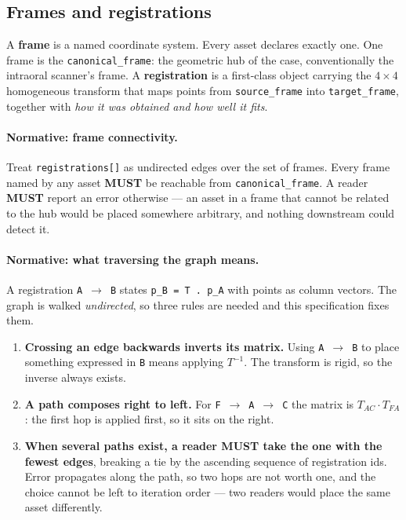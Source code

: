 \documentclass[11pt,a4paper]{article}
\newcommand{\MUST}{\textcolor{uosred}{\textbf{MUST}}}
\newcommand{\code}[1]{\texttt{\small #1}}
\begin{document}
\subsection{Frames and registrations}\label{sec:frames}

A \textbf{frame} is a named coordinate system. Every asset declares exactly one. One frame
is the \code{canonical\_frame}: the geometric hub of the case, conventionally the intraoral
scanner's frame. A \textbf{registration} is a first-class object carrying the $4\times4$
homogeneous transform that maps points from \code{source\_frame} into \code{target\_frame},
together with \emph{how it was obtained and how well it fits}.

\paragraph{Normative: frame connectivity.} Treat \code{registrations[]} as undirected edges
over the set of frames. Every frame named by any asset \MUST{} be reachable from
\code{canonical\_frame}. A reader \MUST{} report an error otherwise --- an asset in a frame
that cannot be related to the hub would be placed somewhere arbitrary, and nothing
downstream could detect it.

\paragraph{Normative: what traversing the graph means.} A registration
\code{A}~$\to$~\code{B} states \code{p\_B = T . p\_A} with points as column vectors. The
graph is walked \emph{undirected}, so three rules are needed and this specification fixes
them.

\begin{enumerate}
  \item \textbf{Crossing an edge backwards inverts its matrix.} Using
  \code{A}~$\to$~\code{B} to place something expressed in \code{B} means applying
  $T^{-1}$. The transform is rigid, so the inverse always exists.
  \item \textbf{A path composes right to left.} For \code{F}~$\to$~\code{A}~$\to$~\code{C}
  the matrix is $T_{AC} \cdot T_{FA}$: the first hop is applied first, so it sits on the
  right.
  \item \textbf{When several paths exist, a reader \MUST{} take the one with the fewest
  edges}, breaking a tie by the ascending sequence of registration ids. Error propagates
  along the path, so two hops are not worth one, and the choice cannot be left to
  iteration order --- two readers would place the same asset differently.
\end{enumerate}
\end{document}

